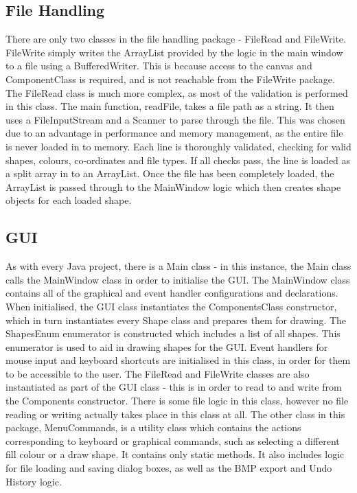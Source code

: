 \documentclass[12pt]{article} %
\begin{document}
\subsection{File Handling}
There are only two classes in the file handling package - FileRead and FileWrite. FileWrite simply writes the ArrayList provided by the logic in the main window to a file using a BufferedWriter. This is because access to the canvas and ComponentClass is required, and is not reachable from the FileWrite package. The FileRead class is much more complex, as most of the validation is performed in this class. The main function, readFile, takes a file path as a string. It then uses a FileInputStream and a Scanner to parse through the file. This was chosen due to an advantage in performance and memory management, as the entire file is never loaded in to memory. Each line is thoroughly validated, checking for valid shapes, colours, co-ordinates and file types. If all checks pass, the line is loaded as a split array in to an ArrayList. Once the file has been completely loaded, the ArrayList is passed through to the MainWindow logic which then creates shape objects for each loaded shape. 

\subsection{GUI}
As with every Java project, there is a Main class - in this instance, the Main class calls the MainWindow class in order to initialise the GUI. The MainWindow class contains all of the graphical and event handler configurations and declarations. When initialised, the GUI class instantiates the ComponentsClass constructor, which in turn instantiates every Shape class and prepares them for drawing. The ShapesEnum enumerator is constructed which includes a list of all shapes. This enumerator is used to aid in drawing shapes for the GUI. Event handlers for mouse input and keyboard shortcuts are initialised in this class, in order for them to be accessible to the user. The FileRead and FileWrite classes are also instantiated as part of the GUI class - this is in order to read to and write from the Components constructor. There is some file logic in this class, however no file reading or writing actually takes place in this class at all. The other class in this package, MenuCommands, is a utility class which contains the actions corresponding to keyboard or graphical commands, such as selecting a different fill colour or a draw shape. It contains only static methods. It also includes logic for file loading and saving dialog boxes, as well as the BMP export and Undo History logic.
\end{document}
